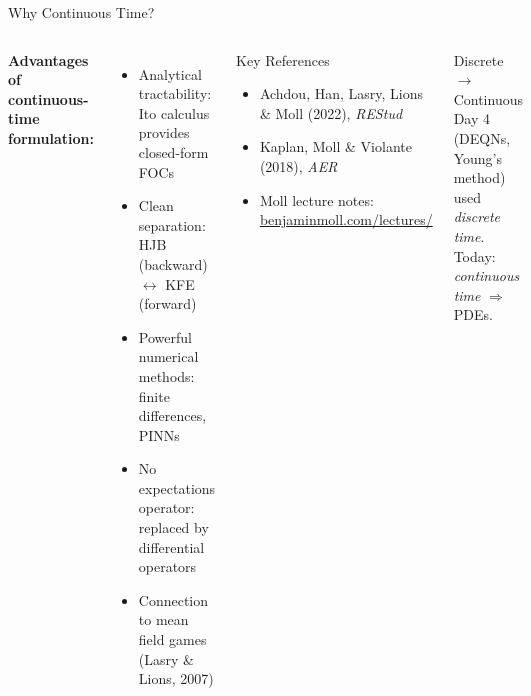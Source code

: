 \documentclass[aspectratio=169,11pt]{beamer}
\newcommand{\emphc}[1]{\textcolor{harvardcrimson}{#1}}
\begin{document}
\begin{frame}{Why Continuous Time?}
\begin{columns}[T]
\textbf{Advantages of continuous-time formulation:}
\begin{itemize}\itemsep2pt
    \item \emphc{Analytical tractability}: Ito calculus provides closed-form FOCs
    \item \emphc{Clean separation}: HJB (backward) $\leftrightarrow$ KFE (forward)
    \item \emphc{Powerful numerical methods}: finite differences, PINNs
    \item \emphc{No expectations operator}: replaced by differential operators
    \item \emphc{Connection to mean field games} (Lasry \& Lions, 2007)
\end{itemize}

\begin{block}{Key References}
\small
\begin{itemize}\itemsep2pt
    \item Achdou, Han, Lasry, Lions \& Moll (2022), \emph{REStud}
    \item Kaplan, Moll \& Violante (2018), \emph{AER}
    \item Moll lecture notes:\\ \url{benjaminmoll.com/lectures/}
\end{itemize}
\end{block}

\vspace{0.3em}
\begin{alertblock}{\small Discrete $\to$ Continuous}
\small
Day 4 (DEQNs, Young's method) used \emph{discrete time}.\\
Today: \emph{continuous time} $\Rightarrow$ PDEs.
\end{alertblock}
\end{columns}
\end{frame}
\end{document}

